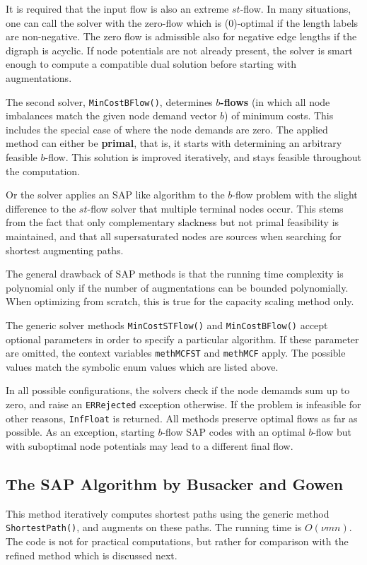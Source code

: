 \documentclass[a4paper,11pt,twoside]{book}
\begin{document}
\begin{multicols}{2}
It is required that the input flow is also an extreme $st$-flow. In many
situations, one can call the solver with the zero-flow which is ($0$)-optimal
if the length labels are non-negative. The zero flow is admissible also for
negative edge lengths if the digraph is acyclic. If node potentials are not
already present, the solver is smart enough to compute a compatible dual
solution before starting with augmentations.

The second solver, \verb/MinCostBFlow()/, determines {\bf $b$-flows}
(in which all node imbalances match the given node demand vector $b$) of
minimum costs. This includes the special case of  where the
node demands are zero. The applied method can either be
{\bf primal}, that is, it starts with determining an
arbitrary feasible $b$-flow. This solution is improved iteratively, and stays
feasible throughout the computation.

Or the solver applies an SAP like algorithm to the $b$-flow problem with the
slight difference to the $st$-flow solver that multiple terminal nodes occur.
This stems from the fact that only complementary slackness but not primal
feasibility is maintained, and that all supersaturated nodes are sources when
searching for shortest augmenting paths.

The general drawback of SAP methods is that the running time complexity is
polynomial only if the number of augmentations can be bounded polynomially.
When optimizing from scratch, this is true for the capacity scaling method only.

The generic solver methods \verb/MinCostSTFlow()/ and \verb/MinCostBFlow()/
accept optional parameters in order to specify a particular algorithm.
If these parameter are omitted, the context variables \verb/methMCFST/ and
\verb/methMCF/ apply. The possible values match the symbolic enum values
which are listed above.

In all possible configurations, the solvers check if the node demamds sum up
to zero, and raise an \verb/ERRejected/ exception otherwise. If the problem is
infeasible for other reasons, \verb/InfFloat/ is returned. All methods preserve
optimal flows as far as possible. As an exception, starting $b$-flow SAP codes
with an optimal $b$-flow but with suboptimal node potentials may lead to a
different final flow.


\subsection{The SAP Algorithm by Busacker and Gowen}
This method iteratively computes shortest paths using the generic method
\verb/ShortestPath()/, and augments on these paths. The running time is
$O(\nu mn)$. The code is not for practical computations, but rather for
comparison with the refined method which is discussed next.



\end{multicols}
\end{document}
